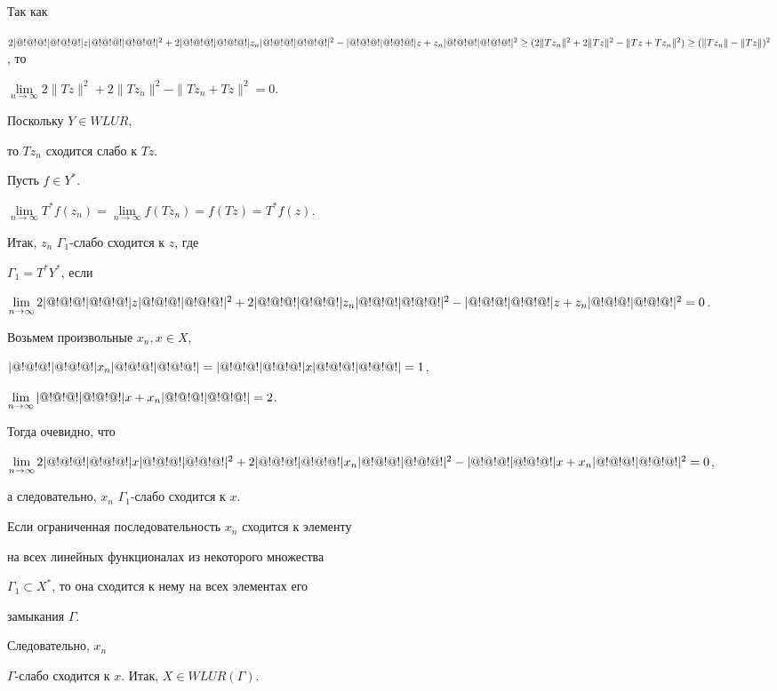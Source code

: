 \begin{pf}
Так как 


$2\triv z\triv^2+2\triv z_n\triv^2-\triv z+z_n\triv^2\ge 


(2\|Tz_n\|^2+2\|Tz\|^2-\|Tz+Tz_n\|^2)\ge 


(\|Tz_n\|-\|Tz\|)^2$, то 


$\lim\limits_{n\to\infty}2\|Tz\|^2+2\|Tz_n\|^2- 


\|Tz_n+Tz\|^2=0$. 


Поскольку $Y\in WLUR$, 


то $Tz_n$ сходится слабо к $Tz$. 


Пусть $f\in Y^*$.\; 


$\lim\limits_{n\to\infty}T^*f(z_n)= 


\lim\limits_{n\to\infty}f(Tz_n)=f(Tz)=T^*f(z)$. 


Итак, $z_n$\; $\Gamma_1$-слабо сходится к $z$, где 


$\Gamma_1=T^*Y^*$, если 


$\lim\limits_{n\to\infty}2\triv z\triv^2+ 


2\triv z_n\triv^2-\triv z+z_n\triv^2=0$. 


Возьмем произвольные $x_n,x\in X$, 


$|@!@!@!|@!@!@!| x_n|@!@!@!|@!@!@!|=|@!@!@!|@!@!@!| x|@!@!@!|@!@!@!| =1$, 


$\lim\limits_{n\to\infty}|@!@!@!|@!@!@!| x+x_n|@!@!@!|@!@!@!| =2$. 


Тогда очевидно, что 


$\lim\limits_{n\to\infty}2\triv x\triv^2+2\triv x_n\triv^2- 


\triv x+x_n\triv^2=0$, 


а следовательно, $x_n$\; $\Gamma_1$-слабо сходится к $x$. 


Если ограниченная последовательность $x_n$ сходится к элементу 


на всех линейных функционалах из некоторого множества 


$\Gamma_1\subset X^*$, то она сходится к нему на всех элементах его 


замыкания $\Gamma$. 


 


Следовательно, $x_n$\; 


$\Gamma$-слабо сходится к $x$. Итак, $X\in WLUR(\Gamma)$. 


\end{pf} 


 


